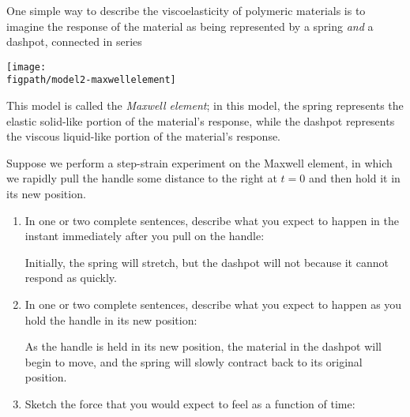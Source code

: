 \begin{activity}
\begin{model}
	One simple way to describe the viscoelasticity of polymeric materials is to imagine the response of the material as being represented by a spring \emph{and} a dashpot, connected in series
	
	\centerline{\texttt{[image: \\figpath/model2-maxwellelement]}}
	
	This model is called the \emph{Maxwell element}; in this model, the spring represents the elastic solid-like portion of the material's response, while the dashpot represents the viscous liquid-like portion of the material's response.
	
\end{model}

	
\begin{ctqs}
	\question Suppose we perform a step-strain experiment on the Maxwell element, in which we rapidly pull the handle some distance to the right at $t=0$ and then hold it in its new position.
	
		\begin{enumerate}
			\item In one or two complete sentences, describe what you expect to happen in the instant immediately after you pull on the handle:
			
				\begin{solution}[1in]
					Initially, the spring will stretch, but the dashpot will not because it cannot respond as quickly.
				\end{solution}
			
			\item In one or two complete sentences, describe what you expect to happen as you hold the handle in its new position:
			
				\begin{solution}[1in]
					As the handle is held in its new position, the material in the dashpot will begin to move, and the spring will slowly contract back to its original position.
				\end{solution}
			
			\item Sketch the force that you would expect to feel as a function of time: \label{\labelbase:ctq:maxwellstepstrain}
			
				\begin{solution}[1.5in]
				\end{solution}
		\end{enumerate}
					
\end{ctqs}


\end{activity}
